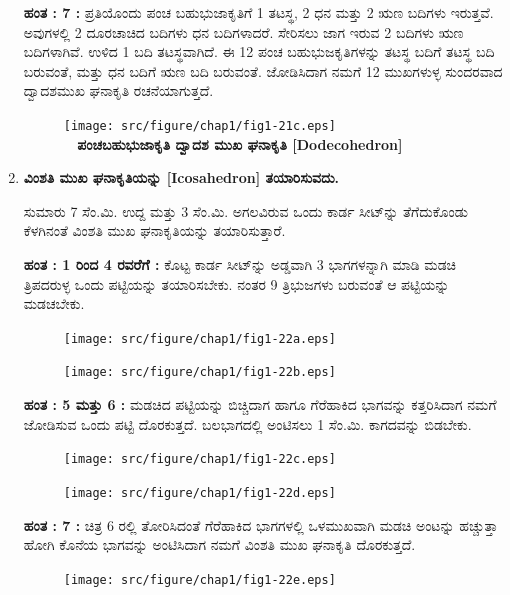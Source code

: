 \begin{enumerate}
 \noindent
 {\bf ಹಂತ : 7 :} ಪ್ರತಿಯೊಂದು ಪಂಚ ಬಹುಭುಜಾಕೃತಿಗೆ  1 ತಟಸ್ಥ, 2 ಧನ ಮತ್ತು 2 ಋಣ ಬದಿಗಳು ಇರುತ್ತವೆ. ಅವುಗಳಲ್ಲಿ 2 ದೂರಚಾಚಿದ ಬದಿಗಳು ಧನ ಬದಿ\break ಗಳಾದರೆ. ಸೇರಿಸಲು ಜಾಗ ಇರುವ 2 ಬದಿಗಳು ಋಣ ಬದಿಗಳಾಗಿವೆ. ಉಳಿದ 1 ಬದಿ ತಟಸ್ಥವಾಗಿದೆ. ಈ 12 ಪಂಚ ಬಹುಭುಜಕೃತಿಗಳನ್ನು ತಟಸ್ಥ ಬದಿಗೆ ತಟಸ್ಥ ಬದಿ ಬರುವಂತೆ, ಮತ್ತು ಧನ ಬದಿಗೆ ಋಣ ಬದಿ ಬರುವಂತೆ. ಜೋಡಿಸಿದಾಗ ನಮಗೆ 12 ಮುಖಗಳುಳ್ಳ ಸುಂದರವಾದ ದ್ವಾದಶಮುಖ ಘನಾಕೃತಿ ರಚನೆಯಾಗುತ್ತದೆ. 
 \begin{figure}[H]
\centering
\texttt{[image: src/figure/chap1/fig1-21c.eps]}\\
\textbf{~\hspace{1.5cm} ಪಂಚಬಹುಭುಜಾಕೃತಿ  \qquad  ದ್ವಾದಶ ಮುಖ ಘನಾಕೃತಿ  [Dodecohedron]}
\end{figure}

 \item \textbf{ವಿಂಶತಿ ಮುಖ ಘನಾಕೃತಿಯನ್ನು [Icosahedron] ತಯಾರಿಸುವದು.}
 
 ಸುಮಾರು 7 ಸೆಂ.ಮಿ. ಉದ್ದ ಮತ್ತು 3  ಸೆಂ.ಮಿ. ಅಗಲವಿರುವ ಒಂದು ಕಾರ್ಡ ಸೀಟ್‌ನ್ನು ತೆಗೆದುಕೊಂಡು ಕೆಳಗಿನಂತೆ ವಿಂಶತಿ ಮುಖ ಘನಾಕೃತಿಯನ್ನು ತಯಾರಿಸುತ್ತಾರೆ. 
 
 \textbf{ಹಂತ : 1 ರಿಂದ 4 ರವರೆಗೆ  :} ಕೊಟ್ಟ ಕಾರ್ಡ ಸೀಟ್‌ನ್ನು ಅಡ್ಡವಾಗಿ 3 ಭಾಗಗಳ\break ನ್ನಾಗಿ ಮಾಡಿ ಮಡಚಿ ತ್ರಿಪದರುಳ್ಳ ಒಂದು ಪಟ್ಟಿಯನ್ನು ತಯಾರಿಸಬೇಕು. ನಂತರ 9 ತ್ರಿಭುಜಗಳು ಬರುವಂತೆ ಆ ಪಟ್ಟಿಯನ್ನು ಮಡಚಬೇಕು. 
 \begin{figure}[H]
\centering
\texttt{[image: src/figure/chap1/fig1-22a.eps]}
\end{figure}
\begin{figure}[H]
\centering
\texttt{[image: src/figure/chap1/fig1-22b.eps]}
\end{figure}


 \textbf{ಹಂತ : 5 ಮತ್ತು 6 :} ಮಡಚಿದ ಪಟ್ಟಿಯನ್ನು ಬಿಚ್ಚಿದಾಗ ಹಾಗೂ ಗೆರೆಹಾಕಿದ ಭಾಗವನ್ನು ಕತ್ತರಿಸಿದಾಗ ನಮಗೆ ಜೋಡಿಸುವ ಒಂದು ಪಟ್ಟಿ ದೊರಕುತ್ತದೆ. ಬಲಭಾಗದಲ್ಲಿ ಅಂಟಿಸಲು 1 ಸೆಂ.ಮಿ. ಕಾಗದವನ್ನು ಬಿಡಬೇಕು.  
 \begin{figure}[H]
\centering
\texttt{[image: src/figure/chap1/fig1-22c.eps]}
\end{figure}
\begin{figure}[H]
\centering
\texttt{[image: src/figure/chap1/fig1-22d.eps]}
\end{figure}
 
 \textbf{ಹಂತ : 7 : } ಚಿತ್ರ 6 ರಲ್ಲಿ ತೋರಿಸಿದಂತೆ ಗೆರೆಹಾಕಿದ ಭಾಗಗಳಲ್ಲಿ ಒಳಮುಖವಾಗಿ ಮಡಚಿ ಅಂಟನ್ನು ಹಚ್ಚುತ್ತಾ ಹೋಗಿ ಕೊನೆಯ ಭಾಗವನ್ನು ಅಂಟಿಸಿದಾಗ ನಮಗೆ ವಿಂಶತಿ ಮುಖ ಘನಾಕೃತಿ ದೊರಕುತ್ತದೆ.  
 \begin{figure}[H]
\centering
\texttt{[image: src/figure/chap1/fig1-22e.eps]}\\
\end{figure}
 
 \end{enumerate}
 
